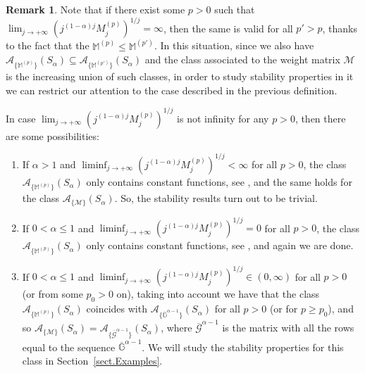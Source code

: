 \documentclass[11pt,a4paper]{article}
\theoremstyle{plain}
\theoremstyle{definition}
\newtheorem{remark}[proposition]{Remark}
\newcommand{\M}{\mathbb{M}}
\newcommand{\G}{\mathbb{G}}
\begin{document}
{
\begin{remark}\label{liminf-remark} Note that if there exist some $p>0$ such that $\lim_{j\rightarrow+\infty}(j^{(1-\alpha)j}M^{(p)}_j)^{1/j}=\infty$, then the same is valid for all $p'>p$, thanks to the fact that the $\M^{(p)}\leq \M^{(p')}$. In this situation, since we also have $\mathcal{A}_{\{\M^{(p)}\}}(S_{\alpha})\subseteq \mathcal{A}_{\{\M^{(p')}\}}(S_{\alpha})$ and the class associated to the weight matrix $\mathcal{M}$ is the increasing union of such classes, in order to study stability properties in it we can restrict our attention to the case described in the previous definition.

In case
$\lim_{j\rightarrow+\infty}(j^{(1-\alpha)j}M^{(p)}_j)^{1/j}$ is not infinity for any $p>0$, then there are some possibilities:
\begin{enumerate}
	\item[(i)] If $\alpha>1$ and $\liminf_{j\rightarrow+\infty}(j^{(1-\alpha)j}M^{(p)}_j)^{1/j}<\infty$ for all $p>0$, the class $\mathcal{A}_{\{\M^{(p)}\}}(S_{\alpha})$ only contains constant functions, see \cite[Thm. 21, and p. 8]{salinas62}, and the same holds for the class $\mathcal{A}_{\{\mathcal{M}\}}(S_{\alpha})$. So, the stability results turn out to be trivial.
	
	\item[(ii)] If $0<\alpha\le 1$ and $\liminf_{j\rightarrow+\infty}(j^{(1-\alpha)j}M^{(p)}_j)^{1/j}=0$ for all $p>0$, the class $\mathcal{A}_{\{\M^{(p)}\}}(S_{\alpha})$ only contains constant functions, see \cite[Thm. 20]{salinas62}, and again we are done.
	
	\item[(iii)] If $0<\alpha\le 1$ and $\liminf_{j\rightarrow+\infty}(j^{(1-\alpha)j}M^{(p)}_j)^{1/j}\in(0,\infty)$ for all $p>0$ (or from some $p_0>0$ on), taking into account \cite[Cor. 8]{salinas62} we have that the class $\mathcal{A}_{\{\M^{(p)}\}}(S_{\alpha})$ coincides with $\mathcal{A}_{\{\overline{\G}^{\alpha-1}\}}(S_{\alpha})$ for all $p>0$ (or for $p\ge p_0$), and so $\mathcal{A}_{\{\mathcal{M}\}}(S_{\alpha})= \mathcal{A}_{\{\mathcal{\overline{G}}^{\alpha-1}\}}(S_{\alpha})$, where $\mathcal{\overline{G}}^{\alpha-1}$ is the matrix with all the rows equal to the sequence $\overline{\G}^{\alpha-1}$. We will study the stability properties for this class in Section~\ref{sect.Examples}.
\end{enumerate}
%
%
%
\end{remark}
}
\end{document}
